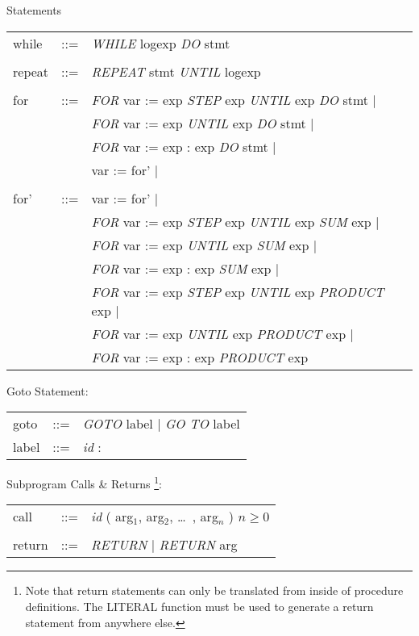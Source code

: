 \begin{describe}{Statements}
\begin{tabular}{lll} 
while & ::= & {\it WHILE\/} logexp {\it DO\/} stmt\\
& &\\
repeat & ::= & {\it REPEAT\/} stmt {\it UNTIL\/} logexp\\
& &\\
for & ::= & {\it FOR\/} var := exp {\it STEP\/} exp {\it UNTIL\/} exp {\it DO\/} stmt $\mid$\\
& &{\it FOR\/} var := exp {\it UNTIL\/} exp {\it DO\/} stmt $\mid$\\
& &{\it FOR\/} var := exp : exp {\it DO\/} stmt $\mid$\\
& &var := for' $\mid$ \\
& &\\
for' & ::= & var := for' $\mid$\\
& &{\it FOR\/} var := exp {\it STEP\/} exp {\it UNTIL\/} exp {\it SUM\/} exp $\mid$\\
& &{\it FOR\/} var := exp {\it UNTIL\/} exp {\it SUM\/} exp $\mid$\\
& &{\it FOR\/} var := exp : exp {\it SUM\/} exp $\mid$\\
& &{\it FOR\/} var := exp {\it STEP\/} exp {\it UNTIL\/} exp {\it PRODUCT\/} exp $\mid$\\
& &{\it FOR\/} var := exp {\it UNTIL\/} exp {\it PRODUCT\/} exp $\mid$\\
& &{\it FOR\/} var := exp : exp {\it PRODUCT\/} exp\\
\end{tabular}

Goto Statement:

\begin{tabular}{lll}
goto & ::= & {\it GOTO\/} label  $\mid$ {\it GO TO\/} label\\
label & ::= & {\it id\/} :\\
\end{tabular}

Subprogram Calls \& Returns \footnote{
Note that return statements can only be translated from inside of
procedure definitions.  The LITERAL function must be used to generate
a return statement from anywhere else.}:

\begin{tabular}{lll}
call & ::= & {\it id\/} ( arg$_1$, arg$_2$, \dots\ , arg$_n$ ) $n \geq 0$\\
& &\\
return & ::= & {\it RETURN\/} $\mid$ {\it RETURN\/} arg\\
\end{tabular}


\end{describe}

